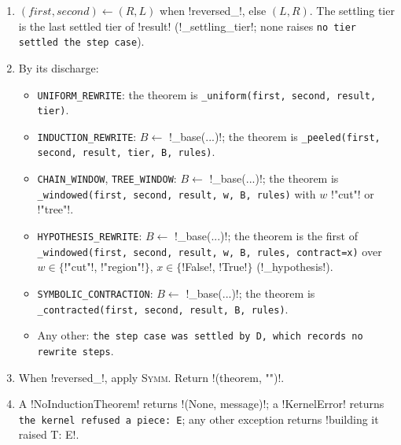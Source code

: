 \begin{algorithm}\label{alg:kernel-induction-theorem}
\begin{enumerate}
\item $(\textit{first}, \textit{second}) \gets (R, L)$ when \code!reversed_!, else $(L, R)$. The settling tier is the last settled tier of \code!result! (\py!_settling_tier!; none raises \texttt{no tier settled the step case}).
\item By its discharge:
  \begin{itemize}
  \item \texttt{UNIFORM\_REWRITE}: the theorem is \texttt{\_\allowbreak{}uniform(\allowbreak{}first,\allowbreak{} second,\allowbreak{} result,\allowbreak{} tier)}.
  \item \texttt{INDUCTION\_REWRITE}: $B\gets$ \py!_base(...)!; the theorem is \texttt{\_\allowbreak{}peeled(\allowbreak{}first,\allowbreak{} second,\allowbreak{} result,\allowbreak{} tier,\allowbreak{} B,\allowbreak{} rules)}.
  \item \texttt{CHAIN\_WINDOW}, \texttt{TREE\_WINDOW}: $B\gets$ \py!_base(...)!; the theorem is \texttt{\_\allowbreak{}windowed(\allowbreak{}first,\allowbreak{} second,\allowbreak{} result,\allowbreak{} w,\allowbreak{} B,\allowbreak{} rules)} with $w$ \code!"cut"! or \code!"tree"!.
  \item \texttt{HYPOTHESIS\_REWRITE}: $B\gets$ \py!_base(...)!; the theorem is the first of \texttt{\_\allowbreak{}windowed(\allowbreak{}first,\allowbreak{} second,\allowbreak{} result,\allowbreak{} w,\allowbreak{} B,\allowbreak{} rules,\allowbreak{} contract=x)} over $w\in\{$\code!"cut"!, \code!"region"!$\}$, $x\in\{$\code!False!, \code!True!$\}$ (\py!_hypothesis!).
  \item \texttt{SYMBOLIC\_CONTRACTION}: $B\gets$ \py!_base(...)!; the theorem is \texttt{\_\allowbreak{}contracted(\allowbreak{}first,\allowbreak{} second,\allowbreak{} result,\allowbreak{} B,\allowbreak{} rules)}.
  \item Any other: \texttt{the step case was settled by D,\allowbreak{} which records no rewrite steps}.
  \end{itemize}
\item When \code!reversed_!, apply \textsc{Symm}. Return \py!(theorem, "")!.
\item A \py!NoInductionTheorem! returns \py!(None, message)!; a \py!KernelError! returns \texttt{the kernel refused a piece: E}; any other exception returns \code!building it raised T: E!.
\end{enumerate}
\end{algorithm}

